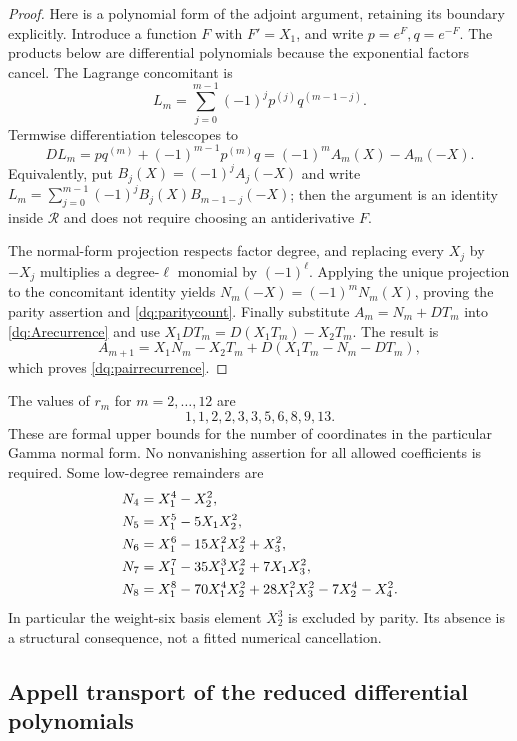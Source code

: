 \documentclass[11pt,a4paper]{article}
\numberwithin{equation}{section}
\theoremstyle{plain}
\theoremstyle{definition}
\theoremstyle{remark}
\begin{document}
\begin{proof}
Here is a polynomial form of the adjoint argument, retaining its
boundary explicitly. Introduce a function $F$ with $F'=X_1$, and
write $p=e^F,q=e^{-F}$. The products below are differential
polynomials because the exponential factors cancel. The Lagrange
concomitant is
\[
 L_m=\sum_{j=0}^{m-1}(-1)^j p^{(j)}q^{(m-1-j)}.
\]
Termwise differentiation telescopes to
\[
 DL_m=pq^{(m)}+(-1)^{m-1}p^{(m)}q
       =(-1)^m A_m(X)-A_m(-X).
\]
Equivalently, put $B_j(X)=(-1)^jA_j(-X)$ and write
$L_m=\sum_{j=0}^{m-1}(-1)^jB_j(X)B_{m-1-j}(-X)$;
then the argument is an identity inside $\mathscr R$ and does not
require choosing an antiderivative $F$.

The normal-form projection respects factor degree, and replacing every
$X_j$ by $-X_j$ multiplies a degree-$\ell$ monomial by $(-1)^\ell$.
Applying the unique projection to the concomitant identity yields
$N_m(-X)=(-1)^mN_m(X)$, proving the parity assertion and
\eqref{dq:paritycount}. Finally substitute $A_m=N_m+DT_m$ into
\eqref{dq:Arecurrence} and use
$X_1DT_m=D(X_1T_m)-X_2T_m$. The result is
\[
 A_{m+1}=X_1N_m-X_2T_m+D(X_1T_m-N_m-DT_m),
\]
which proves \eqref{dq:pairrecurrence}.
\end{proof}

The values of $r_m$ for $m=2,\ldots,12$ are
\[
 1,1,2,2,3,3,5,6,8,9,13.
\]
These are formal upper bounds for the number of coordinates in
the particular Gamma normal form. No nonvanishing assertion for all
allowed coefficients is required. Some low-degree remainders are
\begin{align}
 N_4&=X_1^4-X_2^2,\notag\\
 N_5&=X_1^5-5X_1X_2^2,\notag\\
 N_6&=X_1^6-15X_1^2X_2^2+X_3^2,\label{dq:N4567}\\
 N_7&=X_1^7-35X_1^3X_2^2+7X_1X_3^2,\notag\\
 N_8&=X_1^8-70X_1^4X_2^2+28X_1^2X_3^2-7X_2^4-X_4^2.
 \notag
\end{align}
In particular the weight-six basis element $X_2^3$ is excluded by
parity. Its absence is a structural consequence, not a fitted numerical
cancellation.

\subsection{Appell transport of the reduced differential polynomials}
\end{document}
